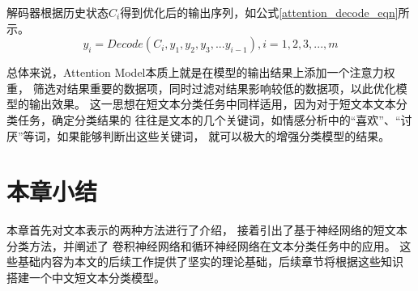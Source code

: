 \documentclass{standalone}
\begin{document}
解码器根据历史状态$C_i$得到优化后的输出序列，如公式\ref{attention_decode_eqn}所示。
\begin{equation}
    y_i=Decode\left ( C_i,y_1,y_2,y_3,...y_{i-1} \right ),i=1,2,3,...,m
    \label{attention_decode_eqn}
\end{equation}

总体来说，Attention Model本质上就是在模型的输出结果上添加一个注意力权重，
筛选对结果重要的数据项，同时过滤对结果影响较低的数据项，以此优化模型的输出效果。
这一思想在短文本分类任务中同样适用，因为对于短文本文本分类任务，确定分类结果的
往往是文本的几个关键词，如情感分析中的“喜欢”、“讨厌”等词，如果能够判断出这些关键词，
就可以极大的增强分类模型的结果。

\section{本章小结}
本章首先对文本表示的两种方法进行了介绍，
接着引出了基于神经网络的短文本分类方法，并阐述了
卷积神经网络和循环神经网络在文本分类任务中的应用。
这些基础内容为本文的后续工作提供了坚实的理论基础，后续章节将根据这些知识
搭建一个中文短文本分类模型。
\end{document}
